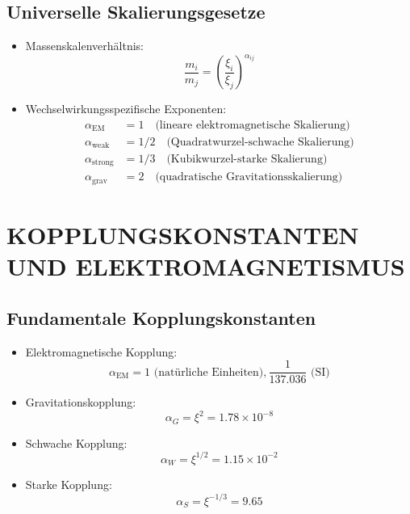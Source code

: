\documentclass[12pt,a4paper]{article}
\begin{document}
	\subsection{Universelle Skalierungsgesetze}
	\begin{itemize}
		\item Massenskalenverhältnis:
		\begin{equation}
			\frac{m_i}{m_j} = \left(\frac{\xi_i}{\xi_j}\right)^{\alpha_{ij}}
		\end{equation}
		
		\item Wechselwirkungsspezifische Exponenten:
		\begin{align}
			\alpha_{\text{EM}} &= 1 \quad \text{(lineare elektromagnetische Skalierung)} \\
			\alpha_{\text{weak}} &= 1/2 \quad \text{(Quadratwurzel-schwache Skalierung)} \\
			\alpha_{\text{strong}} &= 1/3 \quad \text{(Kubikwurzel-starke Skalierung)} \\
			\alpha_{\text{grav}} &= 2 \quad \text{(quadratische Gravitationsskalierung)}
		\end{align}
	\end{itemize}
	
	\section{KOPPLUNGSKONSTANTEN UND ELEKTROMAGNETISMUS}
	
	\subsection{Fundamentale Kopplungskonstanten}
	\begin{itemize}
		\item Elektromagnetische Kopplung:
		\begin{equation}
			\alpha_{\text{EM}} = 1 \text{ (natürliche Einheiten)}, \frac{1}{137.036} \text{ (SI)}
		\end{equation}
		
		\item Gravitationskopplung:
		\begin{equation}
			\alpha_G = \xi^2 = 1.78 \times 10^{-8}
		\end{equation}
		
		\item Schwache Kopplung:
		\begin{equation}
			\alpha_W = \xi^{1/2} = 1.15 \times 10^{-2}
		\end{equation}
		
		\item Starke Kopplung:
		\begin{equation}
			\alpha_S = \xi^{-1/3} = 9.65
		\end{equation}
	\end{itemize}
	
\end{document}
